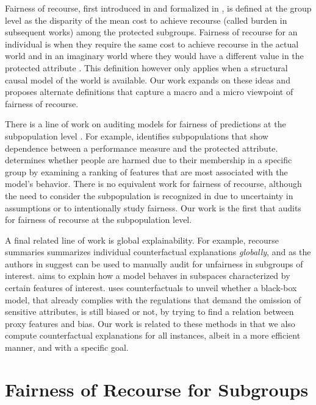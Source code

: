 \documentclass{article}
\begin{document}
Fairness of recourse, first introduced in \cite{ustun2019actionable} and formalized in \cite{gupta2019equalizing}, is defined at the group level as the disparity of the mean cost to achieve recourse (called burden in subsequent works) among the protected subgroups. Fairness of recourse for an individual is when they require the same cost to achieve recourse in the actual world and in an imaginary world where they would have a different value in the protected attribute \cite{KugelgenKBVWS22}. This definition however only applies when a structural causal model of the world is available.
Our work expands on these ideas and proposes alternate definitions that capture a macro and a micro viewpoint of fairness of recourse.


There is a line of work on auditing models for fairness of predictions at the subpopulation level \cite{kearns2018preventing, kearns2019empirical}. For example, \cite{tramer2017fairtest} identifies subpopulations that show dependence between a performance measure and the protected attribute. \cite{black2020fliptest} determines whether people are harmed due to their membership in a specific group by examining a ranking of features that are most associated with the model's behavior. 
There is no equivalent work for fairness of recourse, although the need to consider the subpopulation is recognized in \cite{karimi2020algorithmic} due to uncertainty in assumptions or to intentionally study fairness. 
Our work is the first that audits for fairness of recourse at the subpopulation level.


A final related line of work is global explainability. For example, recourse summaries \cite{rawal2020beyond,ley2022global} summarizes individual counterfactual explanations \emph{globally}, and as the authors in \cite{rawal2020beyond} suggest can be used to manually audit for unfairness in subgroups of interest. \cite{lakkaraju2019faithful} aims to explain how a model behaves in subspaces characterized by certain features of interest. \cite{cornacchia2023auditing} uses counterfactuals to unveil whether a black-box model, that already complies with the regulations that demand the omission of sensitive attributes, is still biased or not, by trying to find a relation between proxy features and bias.
Our work is related to these methods in that we also compute counterfactual explanations for all instances, albeit in a more efficient manner, and with a specific goal.


% 

\section{Fairness of Recourse for Subgroups}
\label{sec:def}
\end{document}
